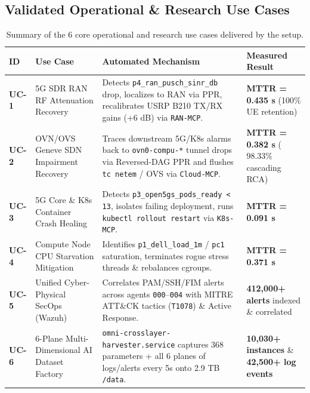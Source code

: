 \documentclass[11pt,a4paper]{article}
\begin{document}
\subsection{Validated Operational \& Research Use Cases}
\begin{table}[htbp]
\centering
\small
\begin{tabular}{p{1.2cm}p{3.6cm}p{5.2cm}p{4.2cm}}
\toprule
\textbf{ID} & \textbf{Use Case} & \textbf{Automated Mechanism} & \textbf{Measured Result} \\
\midrule
\textbf{UC-1} & 5G SDR RAN RF Attenuation Recovery & Detects \texttt{p4\_ran\_pusch\_sinr\_db} drop, localizes to RAN via PPR, recalibrates USRP B210 TX/RX gains (+6 dB) via \texttt{RAN-MCP}. & \textbf{MTTR = 0.435 s} (100\% UE retention) \\
\addlinespace
\textbf{UC-2} & OVN/OVS Geneve SDN Impairment Recovery & Traces downstream 5G/K8s alarms back to \texttt{ovn0-compu-*} tunnel drops via Reversed-DAG PPR and flushes \texttt{tc netem} / OVS via \texttt{Cloud-MCP}. & \textbf{MTTR = 0.382 s} ($98.33\%$ cascading RCA) \\
\addlinespace
\textbf{UC-3} & 5G Core \& K8s Container Crash Healing & Detects \texttt{p3\_open5gs\_pods\_ready < 13}, isolates failing deployment, runs \texttt{kubectl rollout restart} via \texttt{K8s-MCP}. & \textbf{MTTR = 0.091 s} \\
\addlinespace
\textbf{UC-4} & Compute Node CPU Starvation Mitigation & Identifies \texttt{p1\_dell\_load\_1m} / \texttt{pc1} saturation, terminates rogue stress threads \& rebalances cgroups. & \textbf{MTTR = 0.371 s} \\
\addlinespace
\textbf{UC-5} & Unified Cyber-Physical SecOps (Wazuh) & Correlates PAM/SSH/FIM alerts across agents \texttt{000}--\texttt{004} with MITRE ATT\&CK tactics (\texttt{T1078}) \& Active Response. & \textbf{412,000+ alerts} indexed \& correlated \\
\addlinespace
\textbf{UC-6} & 6-Plane Multi-Dimensional AI Dataset Factory & \texttt{omni-crosslayer-harvester.service} captures 368 parameters + all 6 planes of logs/alerts every 5s onto 2.9 TB \texttt{/data}. & \textbf{10,030+ instances} \& \textbf{42,500+ log events} \\
\bottomrule
\end{tabular}
\caption{Summary of the 6 core operational and research use cases delivered by the setup.}
\end{table}

\newpage
\end{document}
